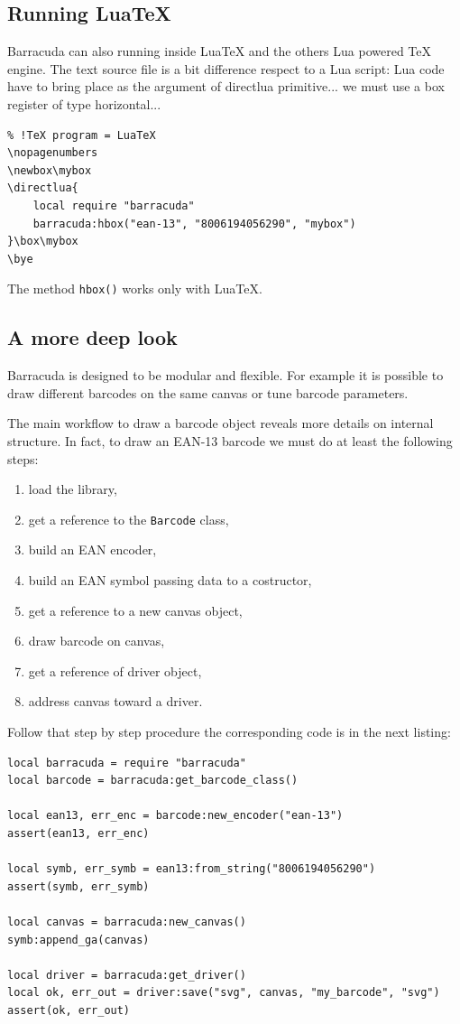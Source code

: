 \documentclass[11pt]{article}
\newcommand{\code}[1]{\texttt{#1}}
\begin{document}
\subsection{Running Lua\TeX}

Barracuda can also running inside Lua\TeX{} and the others Lua powered \TeX{}
engine. The text source file is a bit difference respect to a Lua script: Lua
code have to bring place as the argument of directlua primitive... we must use
a box register of type horizontal...

\begin{Verbatim}
% !TeX program = LuaTeX
\nopagenumbers
\newbox\mybox
\directlua{
	local require "barracuda"
	barracuda:hbox("ean-13", "8006194056290", "mybox")
}\box\mybox
\bye
\end{Verbatim}

The method \code{hbox()} works only with Lua\TeX{}.


\subsection{A more deep look}

Barracuda is designed to be modular and flexible. For example it is possible
to draw different barcodes on the same canvas or tune barcode parameters. 

The main workflow to draw a barcode object reveals more details on internal
structure. In fact, to draw an EAN-13 barcode we must do at least the following
steps:
\begin{enumerate}
	\item load the library,
	\item get a reference to the \code{Barcode} class,
	\item build an EAN encoder,
	\item build an EAN symbol passing data to a costructor,
	\item get a reference to a new canvas object,
	\item draw barcode on canvas,
	\item get a reference of driver object,
	\item address canvas toward a driver.
\end{enumerate}

Follow that step by step procedure the corresponding code is in the next
listing:
\begin{Verbatim}
local barracuda = require "barracuda"
local barcode = barracuda:get_barcode_class()

local ean13, err_enc = barcode:new_encoder("ean-13")
assert(ean13, err_enc)

local symb, err_symb = ean13:from_string("8006194056290")
assert(symb, err_symb)

local canvas = barracuda:new_canvas()
symb:append_ga(canvas)

local driver = barracuda:get_driver()
local ok, err_out = driver:save("svg", canvas, "my_barcode", "svg")
assert(ok, err_out)
\end{Verbatim}
\end{document}
